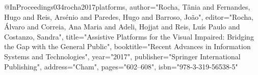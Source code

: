 @InProceedings{034rocha2017platforms,
author="Rocha, T{\^a}nia
and Fernandes, Hugo
and Reis, Ars{\'e}nio
and Paredes, Hugo
and Barroso, Jo{\~a}o",
editor="Rocha, {\'A}lvaro
and Correia, Ana Maria
and Adeli, Hojjat
and Reis, Lu{\'i}s Paulo
and Costanzo, Sandra",
title="Assistive Platforms for the Visual Impaired: Bridging the Gap with the General Public",
booktitle="Recent Advances in Information Systems and Technologies",
year="2017",
publisher="Springer International Publishing",
address="Cham",
pages="602--608",
isbn="978-3-319-56538-5"
}
